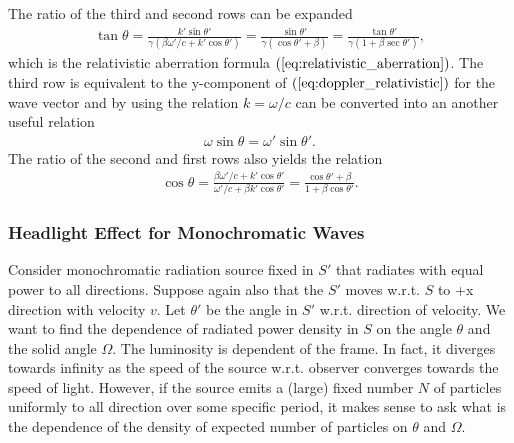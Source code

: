 \documentclass [12pt, a4paper] {article}
\begin{document}
The ratio of the third and second rows can be expanded 
\begin {eqnarray}
    \tan\theta 
    =
    \frac{k'\sin\theta'}{\gamma(\beta\omega'/c + k'\cos\theta')}
    =
    \frac{\sin\theta'}{\gamma(\cos\theta' + \beta)}
    = 
    \frac{\tan\theta'}{\gamma(1 + \beta\sec\theta')},
\end {eqnarray}
which is the relativistic aberration formula $(\ref{eq:relativistic_aberration})$.
The third row is equivalent to the y-component of $(\ref{eq:doppler_relativistic})$ for 
the wave vector and by using the relation $k = \omega/c$ can be converted into an another 
useful relation
\begin {eqnarray}
    \label{eq:useful_relation}
    \omega\sin\theta = \omega'\sin\theta'.
\end {eqnarray}
The ratio of the second and first rows also yields the relation 
\begin {eqnarray}
    \label{eq:klorentz3}
    \cos\theta 
    = 
    \frac{\beta\omega'/c + k'\cos\theta'}{\omega'/c + \beta k'\cos\theta'}
    = 
    \frac{\cos\theta' + \beta}{1 + \beta\cos\theta'}.
\end {eqnarray}


\subsubsection{Headlight Effect for Monochromatic Waves}
Consider monochromatic radiation source fixed in $S'$ that radiates with equal power to 
all directions. Suppose again also that the $S'$ moves w.r.t. $S$ to +x direction with 
velocity $v$. Let $\theta'$ be the angle in $S'$ w.r.t. direction of velocity. We want 
to find the dependence of radiated power density in $S$ on the angle $\theta$ and the 
solid angle $\Omega$. The luminosity is dependent of the frame. In fact, it diverges 
towards infinity as the speed of the source w.r.t. observer converges towards the 
speed of light. However, if the source emits a (large) fixed number $N$ of particles 
uniformly to all direction over some specific period, it makes sense to ask what is 
the dependence of the density of expected number of particles on $\theta$ and $\Omega$.
\end{document}
